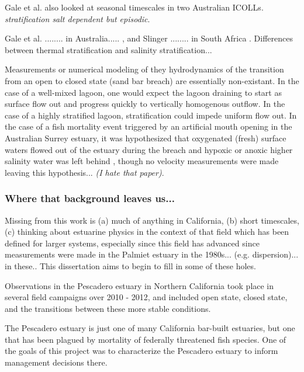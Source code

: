 Gale et al. \parencite*{gale_vertical_2006} also looked at seasonal timescales in two Australian ICOLLs. \emph{stratification salt dependent but episodic}. 




 Gale et al. ........ in Australia..... \parencite*{gale_vertical_2006}, and Slinger ........ in South Africa \parencite*{slinger_evolution_1990}. Differences between thermal stratification and salinity stratification... 

Measurements or numerical modeling of they hydrodynamics of the transition from an open to closed state (sand bar breach) are essentially non-existant. In the case of a well-mixed lagoon, one would expect the lagoon draining to start as surface flow out and progress quickly to vertically homogenous outflow.  In the case of a highly stratified lagoon, stratification could impede uniform flow out. In the case of a fish mortality event triggered by an artificial mouth opening in the Australian Surrey estuary, it was hypothesized that oxygenated (fresh) surface waters flowed out of the estuary during the breach and hypoxic or anoxic higher salinity water was left behind \parencite{becker_artificial_2009}, though no velocity measurements were made leaving this hypothesis... \emph{(I hate that paper)}. 





\subsubsection{Where that background leaves us...}

Missing from this work is (a) much of anything in California, (b) short timescales, (c) thinking about estuarine physics in the context of that field which has been defined for larger systems, especially since this field has advanced since measurements were made in the Palmiet estuary in the 1980s... (e.g. dispersion)... in these.. This dissertation aims to begin to fill in some of these holes. 

Observations in the Pescadero estuary in Northern California took place in several field campaigns over 2010 - 2012, and included open state, closed state, and the transitions between these more stable conditions. 

 The Pescadero estuary is just one of many California bar-built estuaries, but one that has been plagued by mortality of federally threatened fish species. One of the goals of this project was to characterize the Pescadero estuary to inform management decisions there. 


